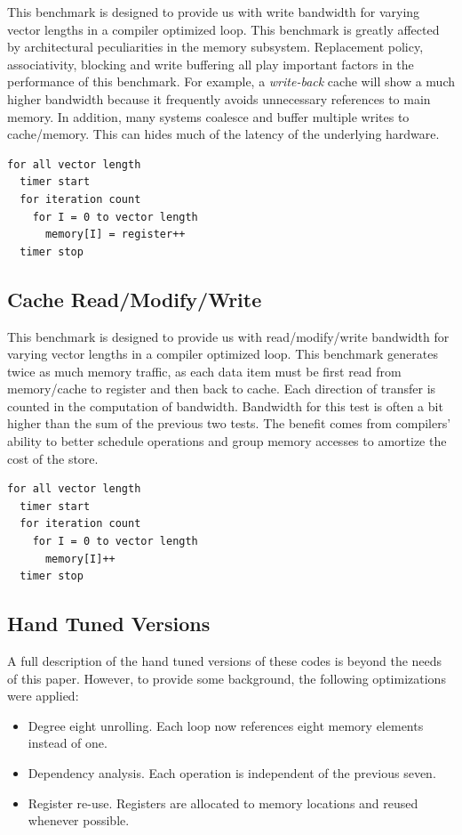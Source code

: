 \documentclass [12pt]{article}
\begin{document}
This benchmark is designed to provide us with write bandwidth for
varying vector lengths in a compiler optimized loop. This benchmark
is greatly affected by architectural peculiarities in the memory subsystem.
Replacement policy, associativity, blocking and write buffering all play important
factors in the performance of this benchmark. For example, a {\em write-back} cache 
will show a much higher bandwidth because it frequently avoids unnecessary 
references to main memory. In addition, many systems coalesce
and buffer multiple writes to cache/memory. This can hides much of the latency
of the underlying hardware.\\

\begin{verbatim}
for all vector length
  timer start
  for iteration count
    for I = 0 to vector length
      memory[I] = register++
  timer stop
\end{verbatim}

\subsection{Cache Read/Modify/Write}

This benchmark is designed to provide us with read/modify/write bandwidth for
varying vector lengths in a compiler optimized loop. This benchmark generates
twice as much memory traffic, as each data item must be first read from 
memory/cache to register and then back to cache. Each direction of transfer is
counted in the computation of bandwidth. Bandwidth for this test is often a 
bit higher than the sum of the previous two tests. The benefit comes from 
compilers' ability to better schedule operations and group memory accesses
to amortize the cost of the store.

\begin{verbatim}
for all vector length
  timer start
  for iteration count
    for I = 0 to vector length
      memory[I]++ 
  timer stop
\end{verbatim}

\subsection{Hand Tuned Versions}

A full description of the hand tuned versions of these codes is beyond the 
needs of this paper. However,
to provide some background, the following optimizations were applied:

\begin{itemize}
\item Degree eight unrolling. Each loop now references eight memory elements instead of one.
\item Dependency analysis. Each operation is independent of the previous seven.
\item Register re-use. Registers are allocated to memory locations and reused whenever possible.
\end{itemize}
\end{document}
